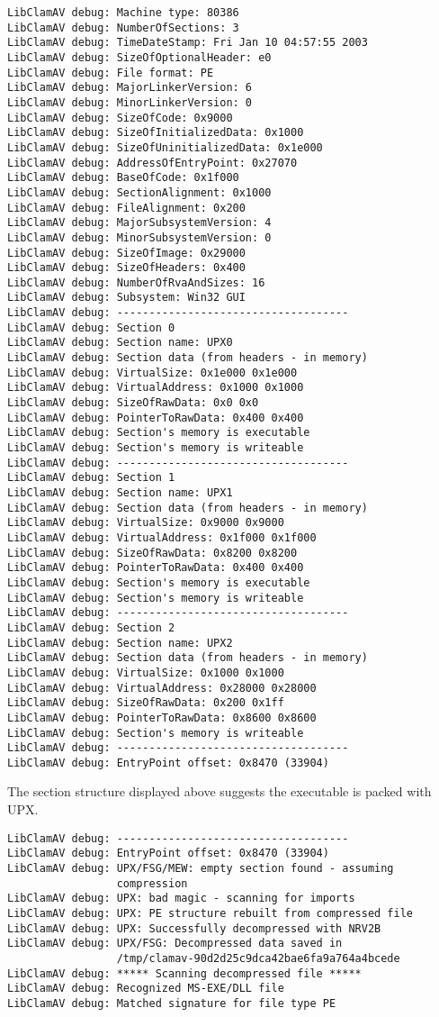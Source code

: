\documentclass[a4paper,titlepage,12pt]{article}
\begin{document}
    \begin{verbatim}
LibClamAV debug: Machine type: 80386
LibClamAV debug: NumberOfSections: 3
LibClamAV debug: TimeDateStamp: Fri Jan 10 04:57:55 2003
LibClamAV debug: SizeOfOptionalHeader: e0
LibClamAV debug: File format: PE
LibClamAV debug: MajorLinkerVersion: 6
LibClamAV debug: MinorLinkerVersion: 0
LibClamAV debug: SizeOfCode: 0x9000
LibClamAV debug: SizeOfInitializedData: 0x1000
LibClamAV debug: SizeOfUninitializedData: 0x1e000
LibClamAV debug: AddressOfEntryPoint: 0x27070
LibClamAV debug: BaseOfCode: 0x1f000
LibClamAV debug: SectionAlignment: 0x1000
LibClamAV debug: FileAlignment: 0x200
LibClamAV debug: MajorSubsystemVersion: 4
LibClamAV debug: MinorSubsystemVersion: 0
LibClamAV debug: SizeOfImage: 0x29000
LibClamAV debug: SizeOfHeaders: 0x400
LibClamAV debug: NumberOfRvaAndSizes: 16
LibClamAV debug: Subsystem: Win32 GUI
LibClamAV debug: ------------------------------------
LibClamAV debug: Section 0
LibClamAV debug: Section name: UPX0
LibClamAV debug: Section data (from headers - in memory)
LibClamAV debug: VirtualSize: 0x1e000 0x1e000
LibClamAV debug: VirtualAddress: 0x1000 0x1000
LibClamAV debug: SizeOfRawData: 0x0 0x0
LibClamAV debug: PointerToRawData: 0x400 0x400
LibClamAV debug: Section's memory is executable
LibClamAV debug: Section's memory is writeable
LibClamAV debug: ------------------------------------
LibClamAV debug: Section 1
LibClamAV debug: Section name: UPX1
LibClamAV debug: Section data (from headers - in memory)
LibClamAV debug: VirtualSize: 0x9000 0x9000
LibClamAV debug: VirtualAddress: 0x1f000 0x1f000
LibClamAV debug: SizeOfRawData: 0x8200 0x8200
LibClamAV debug: PointerToRawData: 0x400 0x400
LibClamAV debug: Section's memory is executable
LibClamAV debug: Section's memory is writeable
LibClamAV debug: ------------------------------------
LibClamAV debug: Section 2
LibClamAV debug: Section name: UPX2
LibClamAV debug: Section data (from headers - in memory)
LibClamAV debug: VirtualSize: 0x1000 0x1000
LibClamAV debug: VirtualAddress: 0x28000 0x28000
LibClamAV debug: SizeOfRawData: 0x200 0x1ff
LibClamAV debug: PointerToRawData: 0x8600 0x8600
LibClamAV debug: Section's memory is writeable
LibClamAV debug: ------------------------------------
LibClamAV debug: EntryPoint offset: 0x8470 (33904)
    \end{verbatim}
    The section structure displayed above suggests the executable is
    packed with UPX.
    \begin{verbatim}
LibClamAV debug: ------------------------------------
LibClamAV debug: EntryPoint offset: 0x8470 (33904)
LibClamAV debug: UPX/FSG/MEW: empty section found - assuming
                 compression
LibClamAV debug: UPX: bad magic - scanning for imports
LibClamAV debug: UPX: PE structure rebuilt from compressed file
LibClamAV debug: UPX: Successfully decompressed with NRV2B
LibClamAV debug: UPX/FSG: Decompressed data saved in
                 /tmp/clamav-90d2d25c9dca42bae6fa9a764a4bcede
LibClamAV debug: ***** Scanning decompressed file *****
LibClamAV debug: Recognized MS-EXE/DLL file
LibClamAV debug: Matched signature for file type PE
    \end{verbatim}
\end{document}
